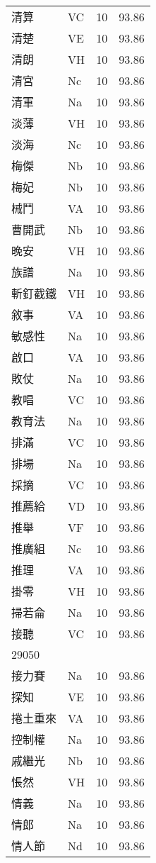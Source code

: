 \documentclass[twocolumn]{book}
\begin{document}
\begin{supertabular}{llrr}
清算 & VC & 10 &  93.86\\
清楚 & VE & 10 &  93.86\\
清朗 & VH & 10 &  93.86\\
清宮 & Nc & 10 &  93.86\\
清軍 & Na & 10 &  93.86\\
淡薄 & VH & 10 &  93.86\\
淡海 & Nc & 10 &  93.86\\
梅傑 & Nb & 10 &  93.86\\
梅妃 & Nb & 10 &  93.86\\
械鬥 & VA & 10 &  93.86\\
曹開武 & Nb & 10 &  93.86\\
晚安 & VH & 10 &  93.86\\
族譜 & Na & 10 &  93.86\\
斬釘截鐵 & VH & 10 &  93.86\\
敘事 & VA & 10 &  93.86\\
敏感性 & Na & 10 &  93.86\\
啟口 & VA & 10 &  93.86\\
敗仗 & Na & 10 &  93.86\\
教唱 & VC & 10 &  93.86\\
教育法 & Na & 10 &  93.86\\
排滿 & VC & 10 &  93.86\\
排場 & Na & 10 &  93.86\\
採摘 & VC & 10 &  93.86\\
推薦給 & VD & 10 &  93.86\\
推舉 & VF & 10 &  93.86\\
推廣組 & Nc & 10 &  93.86\\
推理 & VA & 10 &  93.86\\
掛零 & VH & 10 &  93.86\\
掃若侖 & Na & 10 &  93.86\\
接聽 & VC & 10 &  93.86\\
29050\\
接力賽 & Na & 10 &  93.86\\
探知 & VE & 10 &  93.86\\
捲土重來 & VA & 10 &  93.86\\
控制權 & Na & 10 &  93.86\\
戚繼光 & Nb & 10 &  93.86\\
悵然 & VH & 10 &  93.86\\
情義 & Na & 10 &  93.86\\
情郎 & Na & 10 &  93.86\\
情人節 & Nd & 10 &  93.86\\

\end{supertabular}
\end{document}
